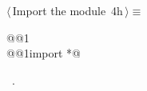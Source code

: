 \documentclass[11pt,oneside]{article}	%
\begin{document}
\begin{flushleft} \small \label{scrap18}
\protect{}$\langle\,$Import the module\nobreak\ {\footnotesize 4h}$\,\rangle\equiv$
\vspace{-1ex}
\begin{list}{}{} \item
\mbox{}\verb@import @@1\verb@@\\
\mbox{}\verb@from @@1\verb@ import *@\\
\mbox{}\verb@@{\NWsep}
\end{list}
\vspace{-1ex}
\footnotesize\addtolength{\baselineskip}{-1ex}
\begin{list}{}{\setlength{\itemsep}{-\parsep}\setlength{\itemindent}{-\leftmargin}}
\item \NWtxtMacroRefIn\ .
\end{list}
\end{flushleft}



\end{document}
